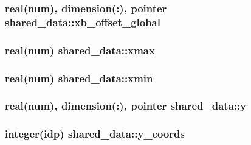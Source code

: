 \subsubsection[{\texorpdfstring{xb\+\_\+offset\+\_\+global}{xb_offset_global}}]{\setlength{\rightskip}{0pt plus 5cm}real(num), dimension(\+:), pointer shared\+\_\+data\+::xb\+\_\+offset\+\_\+global}\hypertarget{namespaceshared__data_a5fe1885535a9b60b53e19525797f551a}{}\label{namespaceshared__data_a5fe1885535a9b60b53e19525797f551a}
\subsubsection[{\texorpdfstring{xmax}{xmax}}]{\setlength{\rightskip}{0pt plus 5cm}real(num) shared\+\_\+data\+::xmax}\hypertarget{namespaceshared__data_abf7145e6fa97e6f2650f0c09c8818b58}{}\label{namespaceshared__data_abf7145e6fa97e6f2650f0c09c8818b58}
\subsubsection[{\texorpdfstring{xmin}{xmin}}]{\setlength{\rightskip}{0pt plus 5cm}real(num) shared\+\_\+data\+::xmin}\hypertarget{namespaceshared__data_a14da8910f32ccb1127e00fdf5dd9afbc}{}\label{namespaceshared__data_a14da8910f32ccb1127e00fdf5dd9afbc}
\subsubsection[{\texorpdfstring{y}{y}}]{\setlength{\rightskip}{0pt plus 5cm}real(num), dimension(\+:), pointer shared\+\_\+data\+::y}\hypertarget{namespaceshared__data_acdc008c8a2a09f5f45b09e3f93aa04cf}{}\label{namespaceshared__data_acdc008c8a2a09f5f45b09e3f93aa04cf}
\subsubsection[{\texorpdfstring{y\+\_\+coords}{y_coords}}]{\setlength{\rightskip}{0pt plus 5cm}integer(idp) shared\+\_\+data\+::y\+\_\+coords}\hypertarget{namespaceshared__data_a89070910fe26fb1d33016351a3a1fd03}{}\label{namespaceshared__data_a89070910fe26fb1d33016351a3a1fd03}
